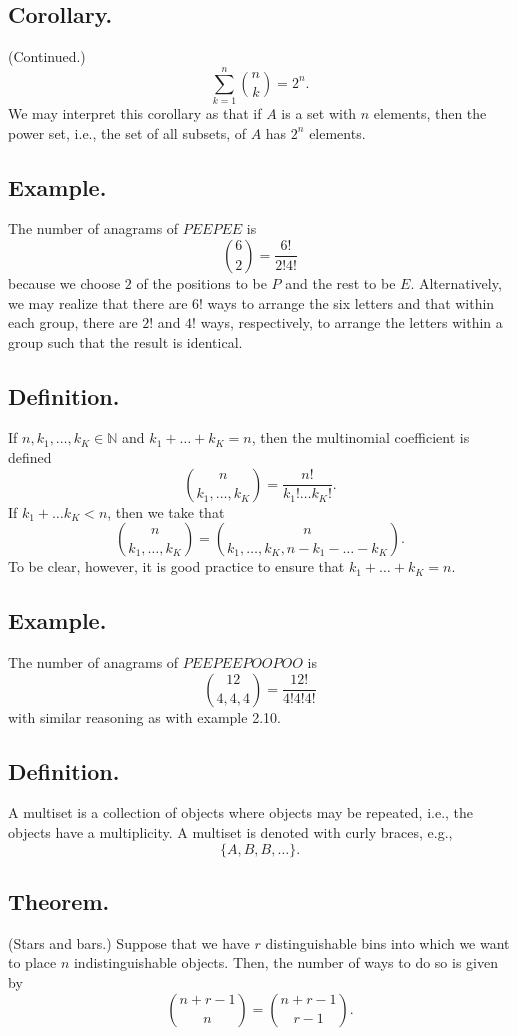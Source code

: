 \documentclass[titlepage]{article}
\begin{document}
\subsection{Corollary.} (Continued.)
$$\sum_{k=1}^{n}\binom{n}{k} = 2^{n}.$$
We may interpret this corollary as that if $A$ is a set with $n$ elements, then the power set, i.e., the set of all subsets, of $A$ has $2^{n}$ elements.

\subsection{Example.} The number of anagrams of $PEEPEE$ is 
$$\binom{6}{2} = \frac{6!}{2!4!}$$
because we choose $2$ of the positions to be $P$ and the rest to be $E$. Alternatively, we may realize that there are $6!$ ways to arrange the six letters and that within each group, there are $2!$ and $4!$ ways, respectively, to arrange the letters within a group such that the result is identical.

\subsection{Definition.} If $n, k_{1}, \ldots, k_{K} \in \mathbb{N}$ and $k_{1} + \ldots + k_{K} = n$, then the multinomial coefficient is defined 
$$\binom{n}{k_{1},\ldots,k_{K}} = \frac{n!}{k_{1}!\ldots k_{K}!}.$$
If $k_{1} + \ldots k_{K} < n$, then we take that 
$$\binom{n}{k_{1},\ldots,k_{K}} = \binom{n}{k_{1},\ldots,k_{K},n-k_{1}-\ldots-k_{K}}.$$
To be clear, however, it is good practice to ensure that $k_{1} + \ldots + k_{K} = n$.

\subsection{Example.} The number of anagrams of $PEEPEEPOOPOO$ is 
$$\binom{12}{4,4,4} = \frac{12!}{4!4!4!}$$
with similar reasoning as with example 2.10.

\subsection{Definition.} A multiset is a collection of objects where objects may be repeated, i.e., the objects have a multiplicity. A multiset is denoted with curly braces, e.g.,  
$$\{A, B, B, \ldots\}.$$

\subsection{Theorem.} (Stars and bars.) Suppose that we have $r$ distinguishable bins into which we want to place $n$ indistinguishable objects. Then, the number of ways to do so is given by 
$$\binom{n+r-1}{n} = \binom{n+r-1}{r-1}.$$
\end{document}
